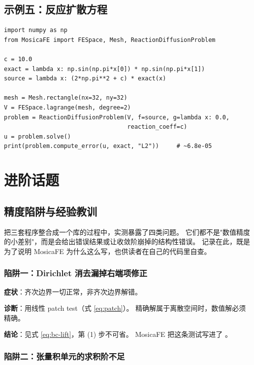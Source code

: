\documentclass[UTF8,11pt,oneside]{ctexbook}
\theoremstyle{definition}
\theoremstyle{plain}
\newcommand{\mosica}{\textsf{MosicaFE}}
\begin{document}
\section{示例五：反应扩散方程}

\begin{lstlisting}[language=MosicaFE,caption={示例 10.5：内置的反应扩散问题}]
import numpy as np
from MosicaFE import FESpace, Mesh, ReactionDiffusionProblem

c = 10.0
exact = lambda x: np.sin(np.pi*x[0]) * np.sin(np.pi*x[1])
source = lambda x: (2*np.pi**2 + c) * exact(x)

mesh = Mesh.rectangle(nx=32, ny=32)
V = FESpace.lagrange(mesh, degree=2)
problem = ReactionDiffusionProblem(V, f=source, g=lambda x: 0.0,
                                   reaction_coeff=c)
u = problem.solve()
print(problem.compute_error(u, exact, "L2"))     # ~6.8e-05
\end{lstlisting}

\chapter{进阶话题}
\label{chap:advanced}

\section{精度陷阱与经验教训}
\label{sec:pitfall-vem}

把三套程序整合成一个库的过程中，实测暴露了四类问题。
它们都不是"数值精度的小差别"，而是会给出错误结果或让收敛阶崩掉的结构性错误。
记录在此，既是为了说明 \mosica{} 为什么这么写，也供读者在自己的代码里自查。

\subsection{陷阱一：Dirichlet 消去漏掉右端项修正}

\textbf{症状}：齐次边界一切正常，非齐次边界解错。

\textbf{诊断}：用线性 patch test（式 \eqref{eq:patch}）。
精确解属于离散空间时，数值解必须精确。

\textbf{结论}：见式 \eqref{eq:bc-lift}，第 (1) 步不可省。
\mosica{} 把这条测试写进了 。

\subsection{陷阱二：张量积单元的求积阶不足}
\end{document}

